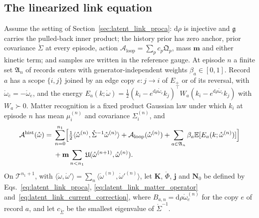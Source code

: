 \subsection{The linearized link equation}\label{app:llp_linear}

Assume the setting of Section~\ref{sec:latent_link_proca}: $\mathrm d\rho$ is injective and $\mathfrak g$ carries the pulled-back inner product; the history prior has zero anchor, prior covariance $\mathring\Sigma$ at every episode, action $\mathcal A_{\mathrm{loop}}=\sum_pc_p\mathfrak Q_p$, mass $\mathbf m$ and either kinetic term; and samples are written in the reference gauge. At episode $n$ a finite set $\mathfrak A_n$ of records enters with generator-independent weights $\beta_a\in[0,1]$. Record $a$ has a scope $\{i,j\}$ joined by an edge copy $e:j\to i$ of $E_+$ or of its reversal, with $\mathring\omega_{\bar e}=-\mathring\omega_e$, and the energy $E_a(k;\mathring\omega)=\frac12(k_i-e^{\mathrm d\rho\mathring\omega_e}k_j)^\top W_a(k_i-e^{\mathrm d\rho\mathring\omega_e}k_j)$ with $W_a\succ0$. Matter recognition is a fixed product Gaussian law under which $k_i$ at episode $n$ has mean $\mu_i^{(n)}$ and covariance $\Sigma_i^{(n)}$, and
\begin{equation}
\begin{aligned}
\mathcal A^{\mathrm{hist}}(\mathring\omega)={}&\sum_{n=0}^{n_1}\Bigl[\tfrac12\langle\mathring\omega^{(n)},\mathring\Sigma^{-1}\mathring\omega^{(n)}\rangle+\mathcal A_{\mathrm{loop}}(\mathring\omega^{(n)})+\sum_{a\in\mathfrak A_n}\beta_a\mathbb E[E_a(k;\mathring\omega^{(n)})]\Bigr]\\
&+\mathbf m\sum_{n<n_1}\mathfrak U(\mathring\omega^{(n+1)},\mathring\omega^{(n)}).
\end{aligned}
\label{eq:llp_history_objective}
\end{equation}
On $\mathcal T^{n_1+1}$, with $\langle\mathring\omega,\mathring\omega'\rangle=\sum_n\langle\mathring\omega^{(n)},\mathring\omega'^{(n)}\rangle$, let $\mathbf K$, $\mathring\Phi$, $\mathbf j$ and $\mathbf N_0$ be defined by Eqs.~\eqref{eq:latent_link_proca}, \eqref{eq:latent_link_matter_operator} and~\eqref{eq:latent_link_current_correction}, where $B_{a,n}=\mathrm d\rho\mathring\omega^{(n)}_e$ for the copy $e$ of record $a$, and let $c_{\mathring\Sigma}$ be the smallest eigenvalue of $\mathring\Sigma^{-1}$.

